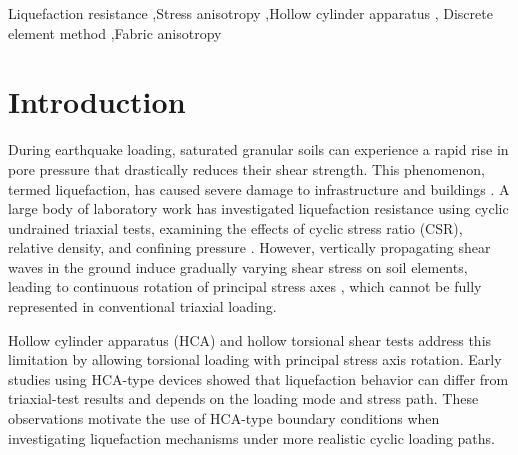 \documentclass[a4paper,fleqn]{cas-sc}
\begin{document}
\begin{abstract}
\end{abstract}



\begin{keywords}
Liquefaction resistance \sep Stress anisotropy \sep Hollow cylinder apparatus \sep
Discrete element method \sep Fabric anisotropy
\end{keywords}

\maketitle

\section{Introduction}
\label{sec:introduction}

During earthquake loading, saturated granular soils can experience a rapid rise in pore pressure that drastically reduces their shear strength. This phenomenon, termed liquefaction, has caused severe damage to infrastructure and buildings \citep{IshiharaKoga1981,SeedIdriss1967}. A large body of laboratory work has investigated liquefaction resistance using cyclic undrained triaxial tests, examining the effects of cyclic stress ratio (CSR), relative density, and confining pressure \citep{Hyodo1991,SeedLee1966,Silver1976,Toki1986}. However, vertically propagating shear waves in the ground induce gradually varying shear stress on soil elements, leading to continuous rotation of principal stress axes \citep{Arthur1980,IshiharaTowhata1983}, which cannot be fully represented in conventional triaxial loading.

Hollow cylinder apparatus (HCA) and hollow torsional shear tests address this limitation by allowing torsional loading with principal stress axis rotation. Early studies using HCA-type devices \citep[e.g.,][]{IshiharaYasuda1975,Tatsuoka1986,YamashitaToki1993} showed that liquefaction behavior can differ from triaxial-test results and depends on the loading mode and stress path. These observations motivate the use of HCA-type boundary conditions when investigating liquefaction mechanisms under more realistic cyclic loading paths.
\end{document}
